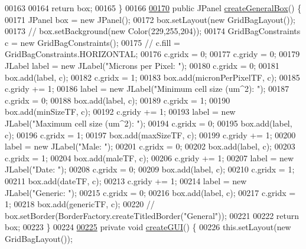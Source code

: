 \begin{DoxyCode}
00163 
00164     \textcolor{keywordflow}{return} box;
00165   \}
00166 
\hypertarget{_settings_window_8java_source_l00170}{}\hyperlink{classgui_1_1_settings_window_a0e6de45a38ef84cda8e8d6938dd32ad1}{00170}   \textcolor{keyword}{public} JPanel \hyperlink{classgui_1_1_settings_window_a0e6de45a38ef84cda8e8d6938dd32ad1}{createGeneralBox}() \{
00171     JPanel box = \textcolor{keyword}{new} JPanel();
00172     box.setLayout(\textcolor{keyword}{new} GridBagLayout());
00173     \textcolor{comment}{// box.setBackground(new Color(229,255,204));}
00174     GridBagConstraints c = \textcolor{keyword}{new} GridBagConstraints();
00175     \textcolor{comment}{// c.fill = GridBagConstraints.HORIZONTAL;}
00176     c.gridx = 0;
00177     c.gridy = 0;
00179     JLabel label = \textcolor{keyword}{new} JLabel(\textcolor{stringliteral}{"Microns per Pixel: "});
00180     c.gridx = 0;
00181     box.add(label, c);
00182     c.gridx = 1;
00183     box.add(micronPerPixelTF, c);
00185     c.gridy += 1;
00186     label = \textcolor{keyword}{new} JLabel(\textcolor{stringliteral}{"Minimum cell size (um^2): "});
00187     c.gridx = 0;
00188     box.add(label, c);
00189     c.gridx = 1;
00190     box.add(minSizeTF, c);
00192     c.gridy += 1;
00193     label = \textcolor{keyword}{new} JLabel(\textcolor{stringliteral}{"Maximum cell size (um^2): "});
00194     c.gridx = 0;
00195     box.add(label, c);
00196     c.gridx = 1;
00197     box.add(maxSizeTF, c);
00199     c.gridy += 1;
00200     label = \textcolor{keyword}{new} JLabel(\textcolor{stringliteral}{"Male: "});
00201     c.gridx = 0;
00202     box.add(label, c);
00203     c.gridx = 1;
00204     box.add(maleTF, c);
00206     c.gridy += 1;
00207     label = \textcolor{keyword}{new} JLabel(\textcolor{stringliteral}{"Date: "});
00208     c.gridx = 0;
00209     box.add(label, c);
00210     c.gridx = 1;
00211     box.add(dateTF, c);
00213     c.gridy += 1;
00214     label = \textcolor{keyword}{new} JLabel(\textcolor{stringliteral}{"Generic: "});
00215     c.gridx = 0;
00216     box.add(label, c);
00217     c.gridx = 1;
00218     box.add(genericTF, c);
00220     \textcolor{comment}{// box.setBorder(BorderFactory.createTitledBorder("General"));}
00221 
00222     \textcolor{keywordflow}{return} box;
00223   \}
00224 
\hypertarget{_settings_window_8java_source_l00225}{}\hyperlink{classgui_1_1_settings_window_ae3700d532c2ae5e2171016e13584b2d6}{00225}   \textcolor{keyword}{private} \textcolor{keywordtype}{void} \hyperlink{classgui_1_1_settings_window_ae3700d532c2ae5e2171016e13584b2d6}{createGUI}() \{
00226     this.setLayout(\textcolor{keyword}{new} GridBagLayout());

\end{DoxyCode}
